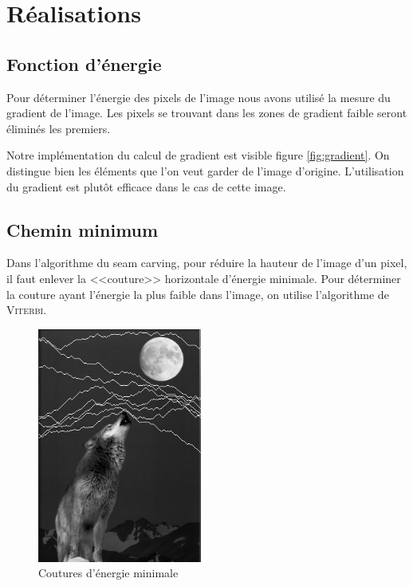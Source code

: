 \documentclass{article}
\begin{document}
\section{Réalisations}
\subsection{Fonction d'énergie}
Pour déterminer l'énergie des pixels de l'image nous avons utilisé la mesure du gradient de l'image. Les pixels se
trouvant dans les zones de gradient faible seront éliminés les premiers.

Notre implémentation du calcul de gradient est visible figure \ref{fig:gradient}. On distingue bien les éléments que l'on veut garder de l'image d'origine. L'utilisation du gradient est plutôt efficace dans le cas de cette image.

\subsection{Chemin minimum}
Dans l'algorithme du seam carving, pour réduire la hauteur de l'image d'un pixel, il faut enlever la <<couture>>
horizontale d'énergie minimale.
Pour  déterminer la couture ayant l'énergie la plus faible dans l'image, on utilise l'algorithme de \textsc{Viterbi}.

\begin{figure}[!ht]
    \center
    \label{seams}
    \includegraphics[width=0.48\textwidth]{img/seams.png}
    \caption{Coutures d'énergie minimale}
\end{figure}
\end{document}
